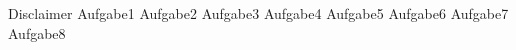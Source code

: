 \documentclass{article}
\begin{document}


{Disclaimer} %
{Aufgabe1} %
{Aufgabe2} %
{Aufgabe3} %
{Aufgabe4} %
{Aufgabe5} %
{Aufgabe6} %
{Aufgabe7} %
{Aufgabe8} %
\end{document}
